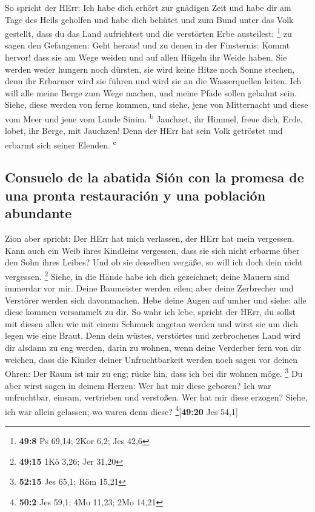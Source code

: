  So spricht der HErr: Ich habe dich erhört zur gnädigen
Zeit und habe dir am Tage des Heils geholfen und habe dich behütet und
zum Bund unter das Volk gestellt, dass du das Land aufrichtest und die
verstörten Erbe austeilest; \footnote{\textbf{49:8} Ps 69,14; 2Kor 6,2;
  Jes 42,6}  zu sagen den Gefangenen: Geht heraus! und zu
denen in der Finsternis: Kommt hervor! dass sie am Wege weiden und auf
allen Hügeln ihr Weide haben.  Sie werden weder hungern
noch dürsten, sie wird keine Hitze noch Sonne stechen, denn ihr Erbarmer
wird sie führen und wird sie an die Wasserquellen leiten.
 Ich will alle meine Berge zum Wege machen, und meine
Pfade sollen gebahnt sein.  Siehe, diese werden von ferne
kommen, und siehe, jene von Mitternacht und diese vom Meer und jene vom
Lande Sinim. \textsuperscript{b}  Jauchzet, ihr Himmel,
freue dich, Erde, lobet, ihr Berge, mit Jauchzen! Denn der HErr hat sein
Volk getröstet und erbarmt sich seiner Elenden. \textsuperscript{c}

\hypertarget{consuelo-de-la-abatida-siuxf3n-con-la-promesa-de-una-pronta-restauraciuxf3n-y-una-poblaciuxf3n-abundante}{%
\subsection{Consuelo de la abatida Sión con la promesa de una pronta
restauración y una población
abundante}\label{consuelo-de-la-abatida-siuxf3n-con-la-promesa-de-una-pronta-restauraciuxf3n-y-una-poblaciuxf3n-abundante}}

 Zion aber spricht: Der HErr hat mich verlassen, der HErr
hat mein vergessen.  Kann auch ein Weib ihres Kindleins
vergessen, dass sie sich nicht erbarme über den Sohn ihres Leibes? Und
ob sie desselben vergäße, so will ich doch dein nicht vergessen.
\footnote{\textbf{49:15} 1Kö 3,26; Jer 31,20}  Siehe, in
die Hände habe ich dich gezeichnet; deine Mauern sind immerdar vor mir.
 Deine Baumeister werden eilen; aber deine Zerbrecher und
Verstörer werden sich davonmachen.  Hebe deine Augen auf
umher und siehe: alle diese kommen versammelt zu dir. So wahr ich lebe,
spricht der HErr, du sollst mit diesen allen wie mit einem Schmuck
angetan werden und wirst sie um dich legen wie eine Braut.
 Denn dein wüstes, verstörtes und zerbrochenes Land wird
dir alsdann zu eng werden, darin zu wohnen, wenn deine Verderber fern
von dir weichen,  dass die Kinder deiner Unfruchtbarkeit
werden noch sagen vor deinen Ohren: Der Raum ist mir zu eng; rücke hin,
dass ich bei dir wohnen möge. \footnote{\textbf{52:15} Jes 65,1; Röm
  15,21}  Du aber wirst sagen in deinem Herzen: Wer hat
mir diese geboren? Ich war unfruchtbar, einsam, vertrieben und
verstoßen. Wer hat mir diese erzogen? Siehe, ich war allein gelassen; wo
waren denn diese? \footnote{\textbf{50:2} Jes 59,1; 4Mo 11,23; 2Mo 14,21}{[}\textbf{49:20}
Jes 54,1{]}


